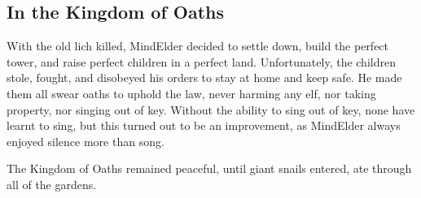 \subsection{In the Kingdom of Oaths}

With the old lich killed, \gls{MindElder} decided to settle down, build the perfect tower, and raise perfect children in a perfect land.
Unfortunately, the children stole, fought, and disobeyed his orders to stay at home and keep safe.
He made them all swear oaths to uphold the law, never harming any elf, nor taking property, nor singing out of key.
Without the ability to sing out of key, none have learnt to sing, but this turned out to be an improvement, as \gls{MindElder} always enjoyed silence more than song.

The Kingdom of Oaths remained peaceful, until giant snails entered, ate through all of the gardens.



